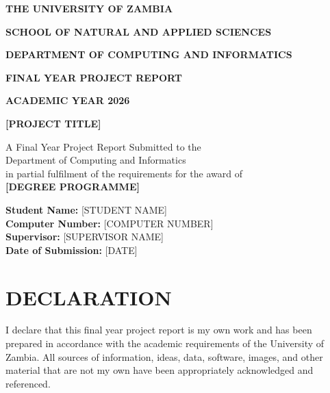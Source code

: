 \documentclass[12pt,a4paper]{report}
\begin{document}

\begin{titlepage}
\centering
\vspace*{1cm}

{\Large\bfseries THE UNIVERSITY OF ZAMBIA\par}
\vspace{0.4cm}
{\large\bfseries SCHOOL OF NATURAL AND APPLIED SCIENCES\par}
\vspace{0.4cm}
{\large\bfseries DEPARTMENT OF COMPUTING AND INFORMATICS\par}

\vfill

{\Large\bfseries FINAL YEAR PROJECT REPORT\par}
\vspace{0.5cm}
{\large\bfseries ACADEMIC YEAR 2026\par}

\vfill

{\LARGE\bfseries [PROJECT TITLE]\par}

\vfill

A Final Year Project Report Submitted to the\\
Department of Computing and Informatics\\
in partial fulfilment of the requirements for the award of\\[0.2cm]
{\bfseries [DEGREE PROGRAMME]}

\vfill

{\bfseries Student Name:} [STUDENT NAME]\\
{\bfseries Computer Number:} [COMPUTER NUMBER]\\[0.3cm]
{\bfseries Supervisor:} [SUPERVISOR NAME]\\
{\bfseries Date of Submission:} [DATE]

\vfill
\end{titlepage}

\chapter*{DECLARATION}

I declare that this final year project report is my own work and has been prepared in accordance with the academic requirements of the University of Zambia. All sources of information, ideas, data, software, images, and other material that are not my own have been appropriately acknowledged and referenced.
\end{document}
